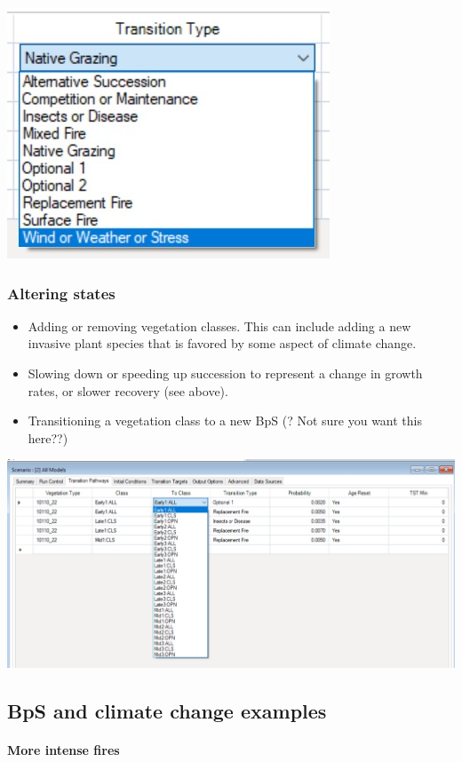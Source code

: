 \documentclass[
]{article}
\providecommand{\tightlist}{%
  \setlength{\itemsep}{0pt}\setlength{\parskip}{0pt}}
\begin{document}
\includegraphics[width=0.35\linewidth]{images/disturbance}

\hypertarget{altering-states}{%
\subsubsection{Altering states}\label{altering-states}}

\begin{itemize}
\tightlist
\item
  Adding or removing vegetation classes. This can include adding a new
  invasive plant species that is favored by some aspect of climate
  change.
\item
  Slowing down or speeding up succession to represent a change in growth
  rates, or slower recovery (see above).
\item
  Transitioning a vegetation class to a new BpS (? Not sure you want
  this here??)
\end{itemize}

\includegraphics[width=1\linewidth]{images/states}

\hypertarget{bps-and-climate-change-examples}{%
\subsection{BpS and climate change
examples}\label{bps-and-climate-change-examples}}

\hypertarget{more-intense-fires}{%
\paragraph{More intense fires}\label{more-intense-fires}}
\end{document}
